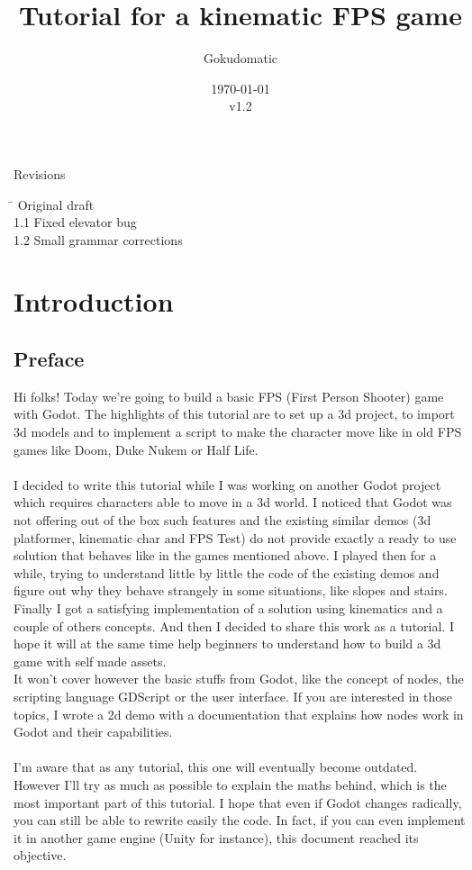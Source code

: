 \documentclass[10pt,a4paper]{article}
\author{Gokudomatic}
\title{Tutorial for a kinematic FPS game}
\date{\today\\v1.2}
\begin{document}
\maketitle

\clearpage

\begin{center}
{\Large Revisions}
\begin{tabbing}
\hspace{1cm} \=  \> Original draft\\
1.1 \> Fixed elevator bug\\
1.2 \> Small grammar corrections
\end{tabbing}
\end{center}

\clearpage

\tableofcontents

\clearpage

\section{Introduction}

\subsection{Preface}
Hi folks! 
Today we're going to build a basic FPS (First Person Shooter) game with Godot. The highlights of this tutorial are to set up a 3d project, to import 3d models and to implement a script to make the character move like in old FPS games like Doom\cite{doom}, Duke Nukem or Half Life.\\
\\
I decided to write this tutorial while I was working on another Godot project which requires characters able to move in a 3d world. I noticed that Godot was not offering out of the box such features and the existing similar demos (3d platformer, kinematic char and FPS Test) do not provide exactly a ready to use solution that behaves like in the games mentioned above. I played then for a while, trying to understand little by little the code of the existing demos and figure out why they behave strangely in some situations, like slopes and stairs. Finally I got a satisfying implementation of a solution using kinematics and a couple of others concepts. And then I decided to share this work as a tutorial. I hope it will at the same time help beginners to understand how to build a 3d game with self made assets.\\
It won't cover however the basic stuffs from Godot, like the concept of nodes, the scripting language GDScript or the user interface. If you are interested in those topics, I wrote a 2d demo\cite{fox2d} with a documentation that explains how nodes work in Godot and their capabilities.\\
\\
I'm aware that as any tutorial, this one will eventually become outdated. However I'll try as much as possible to explain the maths behind, which is the most important part of this tutorial. I hope that even if Godot changes radically, you can still be able to rewrite easily the code. In fact, if you can even implement it in another game engine (Unity for instance), this document reached its objective.
\end{document}
